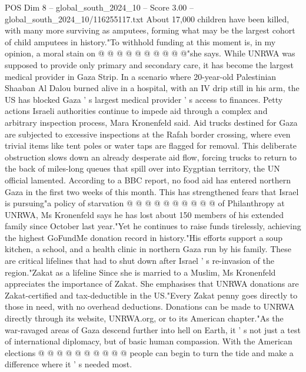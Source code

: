 \begin{textsample}{POS Dim 8 – global\_south\_2024\_10 – Score 3.00 – global\_south\_2024\_10/116255117.txt}
About 17,000 children have been killed, with many more surviving as amputees, forming what may be the largest cohort of child amputees in history."To withhold funding at this moment is, in my opinion, a moral stain on @ @ @ @ @ @ @ @ @ @"she says.
While UNRWA was supposed to provide only primary and secondary care, it has become the largest medical provider in Gaza Strip.
In a scenario where 20-year-old Palestinian Shaaban Al Dalou burned alive in a hospital, with an IV drip still in his arm, the US has blocked Gaza ' s largest medical provider ' s access to finances.
Petty actions Israeli authorities continue to impede aid through a complex and arbitrary inspection process, Mara Kronenfeld said.
Aid trucks destined for Gaza are subjected to excessive inspections at the Rafah border crossing, where even trivial items like tent poles or water taps are flagged for removal.
This deliberate obstruction slows down an already desperate aid flow, forcing trucks to return to the back of miles-long queues that spill over into Eygptian territory, the UN official lamented.
According to a BBC report, no food aid has entered northern Gaza in the first two weeks of this month.
This has strengthened fears that Israel is pursuing"a policy of starvation @ @ @ @ @ @ @ @ @ @ of Philanthropy at UNRWA, Ms Kronenfeld says he has lost about 150 members of his extended family since October last year."Yet he continues to raise funds tirelessly, achieving the highest GoFundMe donation record in history."His efforts support a soup kitchen, a school, and a health clinic in northern Gaza run by his family.
These are critical lifelines that had to shut down after Israel ' s re-invasion of the region."Zakat as a lifeline Since she is married to a Muslim, Ms Kronenfeld appreciates the importance of Zakat.
She emphasises that UNRWA donations are Zakat-certified and tax-deductible in the US."Every Zakat penny goes directly to those in need, with no overhead deductions.
Donations can be made to UNRWA directly through its website, UNRWA.org, or to its American chapter."As the war-ravaged areas of Gaza descend further into hell on Earth, it ' s not just a test of international diplomacy, but of basic human compassion.
With the American elections @ @ @ @ @ @ @ @ @ @ people can begin to turn the tide and make a difference where it ' s needed most.

\end{textsample}

